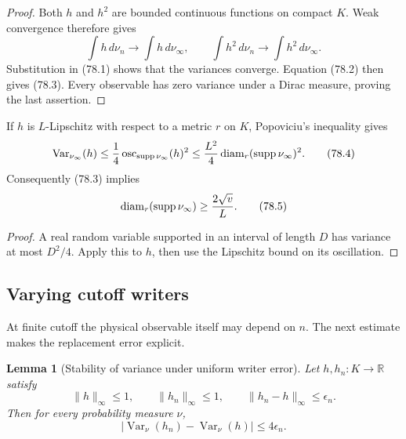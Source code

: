 \documentclass[11pt]{article}
\newtheorem{lemma}[theorem]{Lemma}
\theoremstyle{remark}
\begin{document}
\begin{proof}
Both \(h\) and \(h^2\) are bounded continuous functions on compact
\(K\).  Weak convergence therefore gives
\[
 \int h\,d\nu_n\longrightarrow\int h\,d\nu_\infty,\qquad
 \int h^2\,d\nu_n\longrightarrow\int h^2\,d\nu_\infty.
\]
Substitution in (78.1) shows that the variances converge.  Equation
(78.2) then gives (78.3).  Every observable has zero variance under
a Dirac measure, proving the last assertion.
\end{proof}

If \(h\) is \(L\)-Lipschitz with respect to a metric \(r\) on \(K\),
Popoviciu's inequality gives
\begin{equation}
 \operatorname{Var}_{\nu_\infty}(h)
 \leq {1\over4}
 \operatorname{osc}_{\operatorname{supp}\nu_\infty}(h)^2
 \leq {L^2\over4}
 \operatorname{diam}_r(\operatorname{supp}\nu_\infty)^2.    \tag{78.4}
\end{equation}
Consequently (78.3) implies
\begin{equation}
 \operatorname{diam}_r(\operatorname{supp}\nu_\infty)
 \geq {2\sqrt v\over L}.                                    \tag{78.5}
\end{equation}

\begin{proof}
A real random variable supported in an interval of length \(D\) has
variance at most \(D^2/4\).  Apply this to \(h\), then use the
Lipschitz bound on its oscillation.
\end{proof}

\subsection{Varying cutoff writers}

At finite cutoff the physical observable itself may depend on \(n\).
The next estimate makes the replacement error explicit.

\begin{lemma}[Stability of variance under uniform writer error]
\label{lem:v12v78-writer}
Let \(h,h_n:K\to\mathbb R\) satisfy
\[
 \|h\|_\infty\leq1,\qquad
 \|h_n\|_\infty\leq1,\qquad
 \|h_n-h\|_\infty\leq\epsilon_n.                            \tag{78.6}
\]
Then for every probability measure \(\nu\),
\begin{equation}
 \left|
 \operatorname{Var}_\nu(h_n)-\operatorname{Var}_\nu(h)
 \right|\leq4\epsilon_n.                                    \tag{78.7}
\end{equation}
\end{lemma}
\end{document}
